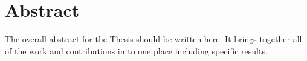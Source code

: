 \chapter*{Abstract}
\glsresetall

\begin{cabstract}
The overall abstract for the Thesis should be written here. It brings together all of the work and contributions in to one place including specific results.

\blindtext
\end{cabstract}